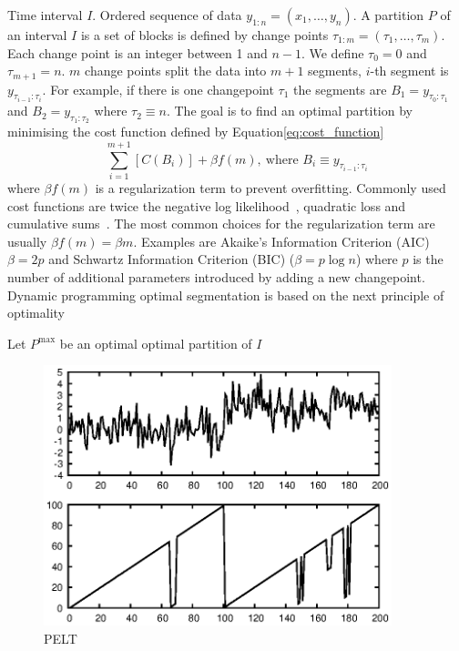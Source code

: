 Time interval $I$.
Ordered sequence of data $y_{1:n}=(x_1,\dots,y_n)$.
A partition $P$ of an interval $I$ is a set of blocks is defined  by change points $\tau_{1:m}=(\tau_1, \dots, \tau_m)$.
Each change point is an integer between 1 and $n-1$.
We define $\tau_0=0$ and $\tau_{m+1}=n$.
$m$ change points split the data into $m+1$ segments, $i$-th segment is $y_{\tau_{i-1} : \tau_i}$.
For example, if there is one changepoint $\tau_1$ the segments are $B_1=y_{\tau_0:\tau_1}$ and $B_2=y_{\tau_1:\tau_2}$ where $\tau_2 \equiv n$.
The goal is to find an optimal partition by minimising the cost function defined by Equation\ref{eq:cost_function}
\begin{equation}\label{eq:cost_function}
	\sum_{i=1}^{m+1} [ C(B_i) ] + \beta f(m),\: \text{where } B_i \equiv y_{\tau_{i-1} : \tau_i}
\end{equation}
where $\beta f(m)$ is a regularization term to prevent overfitting.
Commonly used cost functions are twice the negative log likelihood~\cite{guyon1999underfitting,chen2011parametric},
quadratic loss and cumulative sums~\cite{inclan1994use, rigaill2010pruned}.
The most common choices for the regularization term are usually $\beta f(m) = \beta m$.
Examples are Akaike's Information Criterion (AIC\cite{akaike1974new}) $\beta=2p$ and Schwartz Information Criterion (BIC\cite{schwarz1978estimating}) ($\beta = p \log{n}$) where $p$ is the number of additional parameters introduced by adding a new changepoint.
Dynamic programming optimal segmentation is based on the next principle of optimality
\begin{theorem}
Let $P^{\text{max}}$ be an optimal optimal partition of $I$
\end{theorem}


\begin{figure}[!htb]
	\centering
	\includegraphics[width=0.9\textwidth]{images/example_output_pelt.eps}
	\caption{PELT}\label{fig:pelt_output_example}
\end{figure}


